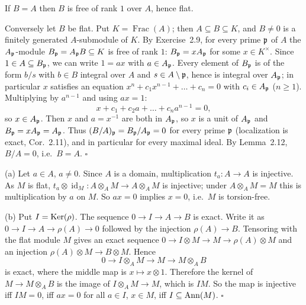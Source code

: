 \documentclass[11pt]{article}
\begin{document}
\pf
If $B=A$ then $B$ is free of rank $1$ over $A$, hence flat.

Conversely let $B$ be flat. Put $K=\operatorname{Frac}(A)$; then $A\subseteq B\subseteq K$, and $B\neq0$ is a finitely generated $A$-submodule of $K$. By Exercise~2.9, for every prime $\mathfrak p$ of $A$ the $A_\mathfrak p$-module $B_\mathfrak p=A_\mathfrak p B\subseteq K$ is free of rank $1$: $B_\mathfrak p=xA_\mathfrak p$ for some $x\in K^\times$. Since $1\in A\subseteq B_\mathfrak p$, we can write $1=ax$ with $a\in A_\mathfrak p$. Every element of $B_\mathfrak p$ is of the form $b/s$ with $b\in B$ integral over $A$ and $s\in A\setminus\mathfrak p$, hence is integral over $A_\mathfrak p$; in particular $x$ satisfies an equation $x^n+c_1x^{n-1}+\dots+c_n=0$ with $c_i\in A_\mathfrak p$ ($n\ge1$). Multiplying by $a^{n-1}$ and using $ax=1$:
\[ x+c_1+c_2a+\dots+c_na^{n-1}=0, \]
so $x\in A_\mathfrak p$. Then $x$ and $a=x^{-1}$ are both in $A_\mathfrak p$, so $x$ is a unit of $A_\mathfrak p$ and $B_\mathfrak p=xA_\mathfrak p=A_\mathfrak p$. Thus $(B/A)_\mathfrak p=B_\mathfrak p/A_\mathfrak p=0$ for every prime $\mathfrak p$ (localization is exact, Cor.~2.11), and in particular for every maximal ideal. By Lemma~2.12, $B/A=0$, i.e.\ $B=A$. \hfill$\square$

\pf
(a) Let $a\in A$, $a\neq0$. Since $A$ is a domain, multiplication $t_a:A\to A$ is injective. As $M$ is flat, $t_a\otimes\operatorname{id}_M:A\otimes_A M\to A\otimes_A M$ is injective; under $A\otimes_A M=M$ this is multiplication by $a$ on $M$. So $ax=0$ implies $x=0$, i.e.\ $M$ is torsion-free.

(b) Put $I=\operatorname{Ker}(\rho)$. The sequence $0\to I\to A\to B$ is exact. Write it as $0\to I\to A\to \rho(A)\to 0$ followed by the injection $\rho(A)\to B$. Tensoring with the flat module $M$ gives an exact sequence $0\to I\otimes M\to M\to \rho(A)\otimes M$ and an injection $\rho(A)\otimes M\to B\otimes M$. Hence
\[ 0\to I\otimes_A M\to M\to M\otimes_A B \]
is exact, where the middle map is $x\mapsto x\otimes 1$. Therefore the kernel of $M\to M\otimes_AB$ is the image of $I\otimes_AM\to M$, which is $IM$. So the map is injective iff $IM=0$, iff $ax=0$ for all $a\in I$, $x\in M$, iff $I\subseteq\operatorname{Ann}(M)$. \hfill$\square$
\end{document}
